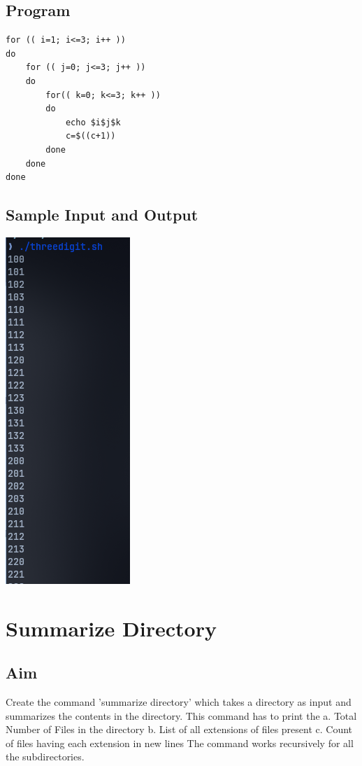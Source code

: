 \subsection{Program}
\begin{lstlisting}[label={list:c_program:queue}]
for (( i=1; i<=3; i++ ))
do
    for (( j=0; j<=3; j++ ))
    do
        for(( k=0; k<=3; k++ ))
        do
            echo $i$j$k
            c=$((c+1))
        done
    done
done
\end{lstlisting}

\subsection{Sample Input and Output}
\includegraphics[]{Cycle_1//Outputs/threegiti.png}


\section{Summarize Directory}
\subsection{Aim}
Create the command 'summarize directory' which takes a directory as input and summarizes the contents in the directory. This command has to print the a. Total Number of Files in the directory b. List of all extensions of files present c. Count of files having each extension in new lines The command works recursively for all the subdirectories.

